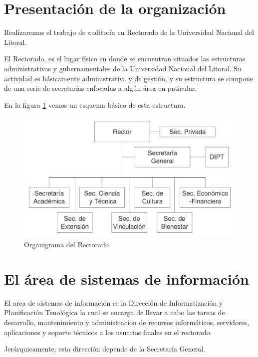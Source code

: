 \documentclass[a4paper,11pt,oneside]{article}
\begin{document}
\maketitle
%
%
\section{Presentación de la organización}
%
Realizaremos el trabajo de auditoría en Rectorado de la Universidad
Nacional del Litoral.

El Rectorado, es el lugar físico en donde se encuentran situados las
estructuras administrativas y gubernamentales de la Universidad
Nacional del Litoral.
Su actividad es básicamente administrativa y de gestión, y su estructura
se compone de una serie de secretarías enfocadas a algún área en
paticular.

En la figura \ref{organi-rectorado} vemos un esquema básico de esta
estructura.
%
\begin{figure}
  \center\includegraphics[width=127mm]{img/organi_rectorado}
  \caption{Organigrama del Rectorado}
  \label{organi-rectorado}
\end{figure}
%
\section{El área de sistemas de información}
%
El area de sistemas de información es la Dirección de Informatización
y Planificación Tenológica la cual se encarga de llevar a cabo las
tareas de desarrollo, mantenimiento y administracion de recursos
informáticos, servidores, aplicaciones y soporte técnicos a los
usuarios finales en el rectorado.

Jerárquicamente, esta dirección depende de la Secretaría General.
%
\end{document}
